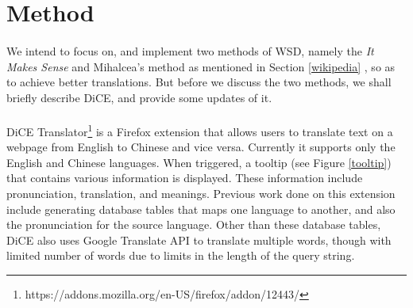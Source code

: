 \documentclass[12 pt]{article}
\begin{document}

\section{Method}
\paragraph{}
We intend to focus on, and implement two methods of WSD, namely the \textit{It Makes Sense} \cite{itmakessense} and Mihalcea's method as mentioned in Section \ref{wikipedia} \cite{wikipedia}, so as to achieve better translations. But before we discuss the two methods, we shall briefly describe DiCE, and provide some updates of it.

\paragraph{}
DiCE Translator\footnote{https://addons.mozilla.org/en-US/firefox/addon/12443/} is a Firefox extension that allows users to translate text on a webpage from English to Chinese and vice versa. Currently it supports only the English and Chinese languages. When triggered, a tooltip (see Figure \ref{tooltip}) that contains various information is displayed. These information include pronunciation, translation, and meanings. Previous work done on this extension include generating database tables that maps one language to another, and also the pronunciation for the source language. Other than these database tables, DiCE also uses Google Translate API to translate multiple words, though with limited number of words due to limits in the length of the query string.
\end{document}
